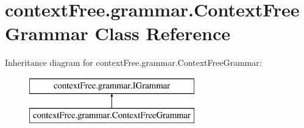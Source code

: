 \hypertarget{classcontext_free_1_1grammar_1_1_context_free_grammar}{\section{context\-Free.\-grammar.\-Context\-Free\-Grammar Class Reference}
\label{classcontext_free_1_1grammar_1_1_context_free_grammar}
}
Inheritance diagram for context\-Free.\-grammar.\-Context\-Free\-Grammar\-:\begin{figure}[H]
\begin{center}
\leavevmode
\includegraphics[height=2.000000cm]{classcontext_free_1_1grammar_1_1_context_free_grammar}
\end{center}
\end{figure}
